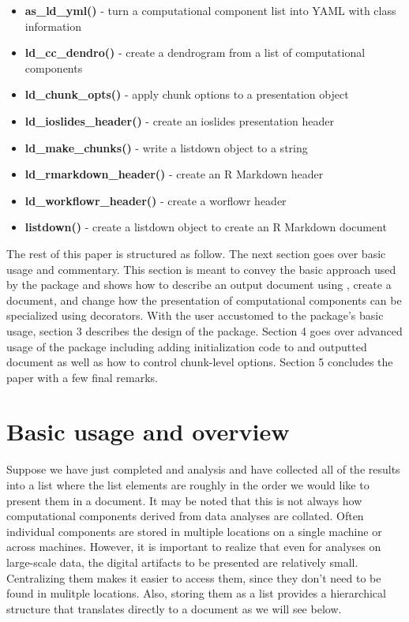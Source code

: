 \begin{itemize}
\item{\bf as\_ld\_yml() }{- turn a computational component list into YAML with class information}
\item{\bf ld\_cc\_dendro() }{- create a dendrogram from a list of computational components}
\item{\bf ld\_chunk\_opts() }{- apply chunk options to a presentation object}
\item{\bf ld\_ioslides\_header() }{- create an ioslides presentation header}
\item{\bf ld\_make\_chunks() }{- write a listdown object to a string}
\item{\bf ld\_rmarkdown\_header() }{- create an R Markdown header}
\item{\bf ld\_workflowr\_header() }{- create a worflowr header}
\item{\bf listdown() }{- create a listdown object to create an R Markdown document}
\end{itemize}

The rest of this paper is structured as follow. The next section goes
over basic usage and commentary. This section is meant to convey the
basic approach used by the package and shows how to describe an output
document using , create a document, and change how the
presentation of computational components can be specialized using
 decorators. With the user accustomed to the package's
basic usage, section 3 describes the design of the package. Section 4
goes over advanced usage of the package including adding initialization
code to and outputted document as well as how to control chunk-level
options. Section 5 concludes the paper with a few final remarks.

\hypertarget{basic-usage-and-overview}{%
\section{Basic usage and overview}\label{basic-usage-and-overview}}

Suppose we have just completed and analysis and have collected all of
the results into a list where the list elements are roughly in the order
we would like to present them in a document. It may be noted that this
is not always how computational components derived from data analyses
are collated. Often individual components are stored in multiple
locations on a single machine or across machines. However, it is
important to realize that even for analyses on large-scale data, the
digital artifacts to be presented are relatively small. Centralizing
them makes it easier to access them, since they don't need to be found
in mulitple locations. Also, storing them as a list provides a
hierarchical structure that translates directly to a document as we will
see below.

